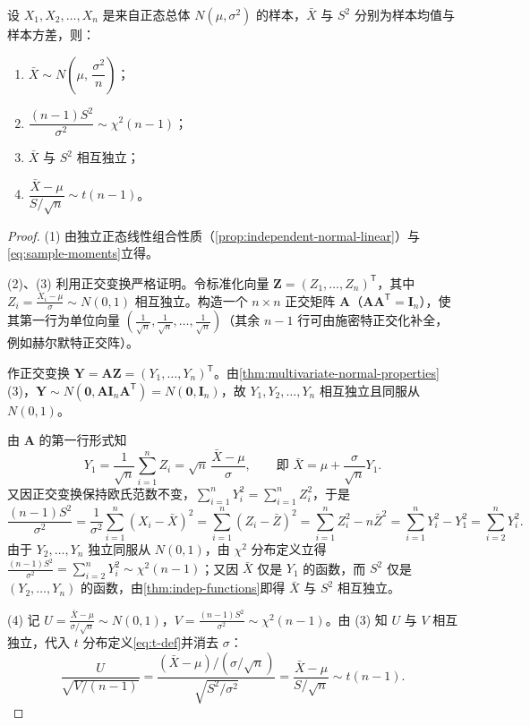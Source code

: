 \begin{theorem}
\label{thm:normal-sampling-one}
设 $X_1,X_2,\ldots,X_n$ 是来自正态总体 $N(\mu,\sigma^2)$ 的样本，$\bar{X}$ 与 $S^2$ 分别为样本均值与样本方差，则：
\begin{enumerate}
  \item $\bar{X}\sim N\!\left(\mu,\,\dfrac{\sigma^2}{n}\right)$；
  \item $\dfrac{(n-1)S^2}{\sigma^2}\sim\chi^2(n-1)$；
  \item $\bar{X}$ 与 $S^2$ 相互独立；
  \item $\dfrac{\bar{X}-\mu}{S/\sqrt{n}}\sim t(n-1)$。
\end{enumerate}
\end{theorem}
\begin{proof}
(1) 由独立正态线性组合性质（\cref{prop:independent-normal-linear}）与\eqref{eq:sample-moments}立得。

(2)、(3) 利用正交变换严格证明。令标准化向量 $\bm{Z}=(Z_1,\ldots,Z_n)^{\mathsf{T}}$，其中 $Z_i=\frac{X_i-\mu}{\sigma}\sim N(0,1)$ 相互独立。构造一个 $n\times n$ 正交矩阵 $\bm{A}$（$\bm{A}\bm{A}^{\mathsf{T}}=\bm{I}_n$），使其第一行为单位向量 $\left(\frac{1}{\sqrt{n}},\frac{1}{\sqrt{n}},\ldots,\frac{1}{\sqrt{n}}\right)$（其余 $n-1$ 行可由施密特正交化补全，例如赫尔默特正交阵）。

作正交变换 $\bm{Y}=\bm{A}\bm{Z}=(Y_1,\ldots,Y_n)^{\mathsf{T}}$。由\cref{thm:multivariate-normal-properties}(3)，$\bm{Y}\sim N(\bm{0},\bm{A}\bm{I}_n\bm{A}^{\mathsf{T}})=N(\bm{0},\bm{I}_n)$，故 $Y_1,Y_2,\ldots,Y_n$ 相互独立且同服从 $N(0,1)$。

由 $\bm{A}$ 的第一行形式知
\[
  Y_1=\frac{1}{\sqrt{n}}\sum_{i=1}^{n}Z_i=\sqrt{n}\,\frac{\bar{X}-\mu}{\sigma},
  \qquad\text{即 }\bar{X}=\mu+\frac{\sigma}{\sqrt{n}}Y_1.
\]
又因正交变换保持欧氏范数不变，$\sum_{i=1}^{n}Y_i^2=\sum_{i=1}^{n}Z_i^2$，于是
\[
  \frac{(n-1)S^2}{\sigma^2}
  =\frac{1}{\sigma^2}\sum_{i=1}^{n}(X_i-\bar{X})^2
  =\sum_{i=1}^{n}(Z_i-\bar{Z})^2
  =\sum_{i=1}^{n}Z_i^2-n\bar{Z}^2
  =\sum_{i=1}^{n}Y_i^2-Y_1^2
  =\sum_{i=2}^{n}Y_i^2.
\]
由于 $Y_2,\ldots,Y_n$ 独立同服从 $N(0,1)$，由 $\chi^2$ 分布定义立得 $\frac{(n-1)S^2}{\sigma^2}=\sum_{i=2}^{n}Y_i^2\sim\chi^2(n-1)$；又因 $\bar{X}$ 仅是 $Y_1$ 的函数，而 $S^2$ 仅是 $(Y_2,\ldots,Y_n)$ 的函数，由\cref{thm:indep-functions}即得 $\bar{X}$ 与 $S^2$ 相互独立。

(4) 记 $U=\frac{\bar{X}-\mu}{\sigma/\sqrt{n}}\sim N(0,1)$，$V=\frac{(n-1)S^2}{\sigma^2}\sim\chi^2(n-1)$。由 (3) 知 $U$ 与 $V$ 相互独立，代入 $t$ 分布定义\eqref{eq:t-def}并消去 $\sigma$：
\[
  \frac{U}{\sqrt{V/(n-1)}}
  =\frac{(\bar{X}-\mu)/(\sigma/\sqrt{n})}{\sqrt{S^2/\sigma^2}}
  =\frac{\bar{X}-\mu}{S/\sqrt{n}}\sim t(n-1).
\]
\end{proof}

